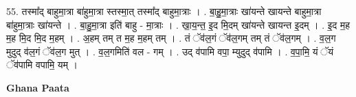 \documentclass[17pt]{extarticle}
\begin{document}
55. तस्मा᳚द् बाहुमा॒त्रा बा॑हुमा॒त्रा स्तस्मा॒त् तस्मा᳚द् बाहुमा॒त्राः । . बा॒हु॒मा॒त्राः खा॑यन्ते खायन्ते बाहुमा॒त्रा बा॑हुमा॒त्राः खा॑यन्ते । . बा॒हु॒मा॒त्रा इति॑ बाहु - मा॒त्राः । . खा॒य॒न्त॒ इ॒द मि॒दम् खा॑यन्ते खायन्त इ॒दम् । . इ॒द म॒ह म॒ह मि॒द मि॒द म॒हम् । . अ॒हम् तम् त म॒ह म॒हम् तम् । . तं ॅव॑ल॒गं ॅव॑ल॒गम् तम् तं ॅव॑ल॒गम् । . व॒ल॒ग मुदुद् व॑ल॒गं ॅव॑ल॒ग मुत् । . व॒ल॒गमिति॑ वल - गम् । . उद् व॑पामि वपा॒ म्युदुद् व॑पामि । . व॒पा॒मि॒ यं ॅयं ॅव॑पामि वपामि॒ यम् । \newline

\textbf{Ghana Paata } \newline
\end{document}
